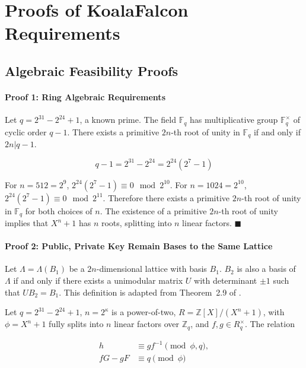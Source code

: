 \section{Proofs of KoalaFalcon Requirements}\label{appendix-detailed-loss-term-derivations}

\subsection{Algebraic Feasibility Proofs}\label{appendix-alg-feas}

\paragraph{Proof 1: Ring Algebraic Requirements}

Let $q = 2^{31} - 2^{24} + 1$, a known prime. The field $\mathbb{F}_q$ has multiplicative group $\mathbb{F}_q^\times$ of cyclic order $q-1$. There exists a primitive $2n$-th root of unity in $\mathbb{F}_q$ if and only if $2n | q - 1$. 

$$
q - 1 = 2^{31} - 2^{24}  = 2^{24}(2^7 - 1) 
$$

For $n=512=2^9$, $2^{24}(2^7 - 1) \equiv 0  \mod 2^{10}$. For $n=1024=2^{10}$, $2^{24}(2^7 - 1) \equiv 0  \mod 2^{11}$. Therefore there exists a 
primitive $2n$-th root of unity in $\mathbb{F}_q$ for both choices of $n$. The existence of a primitive $2n$-th root of unity implies that 
$X^n + 1$ has $n$ roots, splitting into $n$ linear factors. $\blacksquare$

\paragraph{Proof 2: Public, Private Key Remain Bases to the Same Lattice}

Let $\Lambda = \Lambda(B_1)$ be a $2n$-dimensional lattice with basis $B_1$. $B_2$ is also a basis of $\Lambda$ if and only if there exists a unimodular matrix $U$ with determinant $\pm 1$ such that $UB_2 = B_1$. This definition is adapted from Theorem~2.9 of \cite{Menezes2026GentleIntro}.

Let $q = 2^{31} - 2^{24} + 1$, $n=2^\kappa$ is a power-of-two, $R = \mathbb{Z}[X]/(X^n + 1)$, with $\phi = X^n + 1$ fully splits into $n$ linear factors over $\mathbb{Z}_q$, and $f, g \in R_q^\times$. The relation

$$
\begin{aligned}
h &\equiv g f^{-1} \pmod{\phi, q}, \\
fG - gF &\equiv q \pmod{\phi}
\end{aligned}
$$

